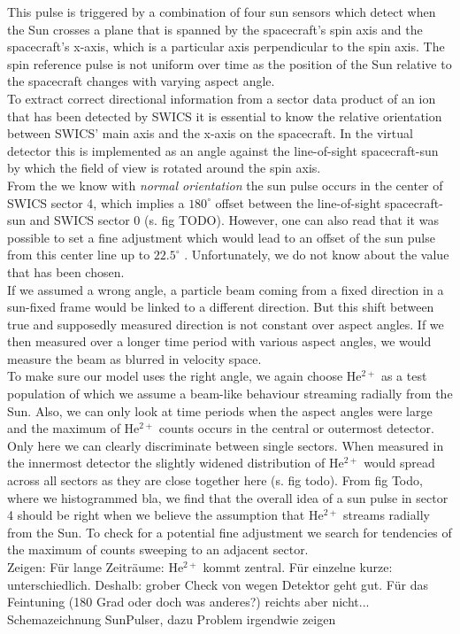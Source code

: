 This pulse is triggered by a combination of four sun sensors which detect when the Sun crosses a plane that is spanned by the spacecraft's spin axis and the spacecraft's x-axis, which is a particular axis perpendicular to the spin axis.
The spin reference pulse is not uniform over time as the position of the Sun relative to the spacecraft changes with varying aspect angle.\\
To extract correct directional information from a sector data product of an ion that has been detected by SWICS it is essential to know the relative orientation between SWICS' main axis and the x-axis on the spacecraft. In the virtual detector this is implemented as an angle against the line-of-sight spacecraft-sun by which the field of view is rotated around the spin axis.\\
From the \citet[][S.20-22]{swics_dpu} we know with \textit{normal orientation} the sun pulse occurs in the center of SWICS sector 4, which implies a $180^\circ$ offset between the line-of-sight spacecraft-sun and SWICS sector 0 (s. fig TODO). However, one can also read that it was possible to set a fine adjustment which would lead to an offset of the sun pulse from this center line up to $22.5^\circ$ \citet[][S.48]{swics_dpu}. Unfortunately, we do not know about the value that has been chosen.
\\
If we assumed a wrong angle, a particle beam coming from a fixed direction in a sun-fixed frame would be linked to a different direction. But this shift between true and supposedly measured direction is not constant over aspect angles. If we then measured over a longer time period with various aspect angles, we would measure the beam as blurred in velocity space.
\\
To make sure our model uses the right angle, we again choose $\mathrm{He^{2+}}$ as a test population of which we assume a beam-like behaviour streaming radially from the Sun. Also, we can only look at time periods when the aspect angles were large and the maximum of $\mathrm{He^{2+}}$ counts occurs in the central or outermost detector. Only here we can clearly discriminate between single sectors. When measured in the innermost detector the slightly widened distribution of $\mathrm{He^{2+}}$ would spread across all sectors as they are close together here (s. fig todo).
From fig Todo, where we histogrammed bla, we find that the overall idea of a sun pulse in sector 4 should be right when we believe the assumption that $\mathrm{He^{2+}}$ streams radially from the Sun. To check for a potential fine adjustment we search for tendencies of the maximum of counts sweeping to an adjacent sector.
\\
Zeigen: Für lange Zeiträume: $\mathrm{He^{2+}}$ kommt zentral. Für einzelne kurze: unterschiedlich.
Deshalb: grober Check von wegen Detektor geht gut. Für das Feintuning (180 Grad oder doch was anderes?) reichts aber nicht...
\\
Schemazeichnung SunPulser, dazu Problem irgendwie zeigen

